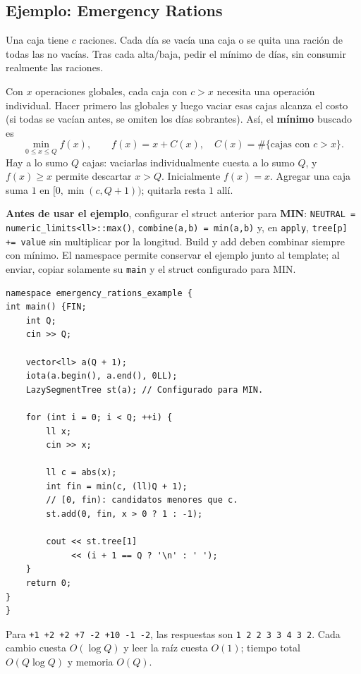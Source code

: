 \subsection{Ejemplo: Emergency Rations}
Una caja tiene $c$ raciones. Cada d\'ia se vac\'ia una caja o se quita una
raci\'on de todas las no vac\'ias. Tras cada alta/baja, pedir el m\'inimo de
d\'ias, sin consumir realmente las raciones.

Con $x$ operaciones globales, cada caja con $c>x$ necesita una operaci\'on
individual. Hacer primero las globales y luego vaciar esas cajas alcanza
el costo (si todas se vac\'ian antes, se omiten los d\'ias sobrantes).
As\'i, el \textbf{m\'inimo} buscado es
\[
\min_{0\le x\le Q} f(x),\qquad f(x)=x+C(x),\quad
C(x)=\#\{\text{cajas con }c>x\}.
\]
Hay a lo sumo $Q$ cajas: vaciarlas individualmente cuesta a lo sumo $Q$,
y $f(x)\ge x$ permite descartar $x>Q$. Inicialmente $f(x)=x$.
Agregar una caja suma $1$ en $[0,\min(c,Q+1))$; quitarla resta $1$ all\'i.

\textbf{Antes de usar el ejemplo}, configurar el struct anterior para
\textbf{MIN}: \texttt{NEUTRAL = numeric\_limits<ll>::max()},
\texttt{combine(a,b) = min(a,b)} y, en \texttt{apply},
\texttt{tree[p] += value} sin multiplicar por la longitud.
Build y add deben combinar siempre con m\'inimo.
El namespace permite conservar el ejemplo junto al template; al enviar,
copiar solamente su \texttt{main} y el struct configurado para MIN.

\begin{lstlisting}[style=cpp]
namespace emergency_rations_example {
int main() {FIN;
    int Q;
    cin >> Q;

    vector<ll> a(Q + 1);
    iota(a.begin(), a.end(), 0LL);
    LazySegmentTree st(a); // Configurado para MIN.

    for (int i = 0; i < Q; ++i) {
        ll x;
        cin >> x;

        ll c = abs(x);
        int fin = min(c, (ll)Q + 1);
        // [0, fin): candidatos menores que c.
        st.add(0, fin, x > 0 ? 1 : -1);

        cout << st.tree[1]
             << (i + 1 == Q ? '\n' : ' ');
    }
    return 0;
}
}
\end{lstlisting}

Para \texttt{+1 +2 +2 +7 -2 +10 -1 -2}, las respuestas son
\texttt{1 2 2 3 3 4 3 2}. Cada cambio cuesta $O(\log Q)$ y leer la
ra\'iz cuesta $O(1)$; tiempo total $O(Q\log Q)$ y memoria $O(Q)$.
